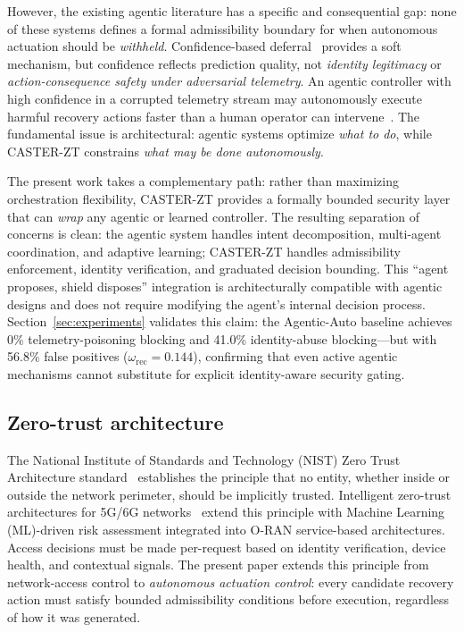 \documentclass[10pt,journal,compsoc]{IEEEtran}
\begin{document}
However, the existing agentic literature has a specific and consequential gap: none of these systems defines a formal admissibility boundary for when autonomous actuation should be \emph{withheld}.
Confidence-based deferral~\cite{toward_autonomous_oran_2026} provides a soft mechanism, but confidence reflects prediction quality, not \emph{identity legitimacy} or \emph{action-consequence safety under adversarial telemetry}.
An agentic controller with high confidence in a corrupted telemetry stream may autonomously execute harmful recovery actions faster than a human operator can intervene~\cite{amodei2016concrete}.
The fundamental issue is architectural: agentic systems optimize \emph{what to do}, while CASTER-ZT constrains \emph{what may be done autonomously}.

The present work takes a complementary path: rather than maximizing orchestration flexibility, CASTER-ZT provides a formally bounded security layer that can \emph{wrap} any agentic or learned controller.
The resulting separation of concerns is clean: the agentic system handles intent decomposition, multi-agent coordination, and adaptive learning; CASTER-ZT handles admissibility enforcement, identity verification, and graduated decision bounding.
This ``agent proposes, shield disposes'' integration is architecturally compatible with agentic designs and does not require modifying the agent's internal decision process.
Section~\ref{sec:experiments} validates this claim: the Agentic-Auto baseline achieves 0\% telemetry-poisoning blocking and 41.0\% identity-abuse blocking---but with 56.8\% false positives ($\omega_{\mathrm{rec}} = 0.144$), confirming that even active agentic mechanisms cannot substitute for explicit identity-aware security gating.

\subsection{Zero-trust architecture}
The National Institute of Standards and Technology (NIST) Zero Trust Architecture standard~\cite{rose2020nist} establishes the principle that no entity, whether inside or outside the network perimeter, should be implicitly trusted.
Intelligent zero-trust architectures for 5G/6G networks~\cite{liyanage2022izta} extend this principle with Machine Learning (ML)-driven risk assessment integrated into O-RAN service-based architectures.
Access decisions must be made per-request based on identity verification, device health, and contextual signals.
The present paper extends this principle from network-access control to \emph{autonomous actuation control}: every candidate recovery action must satisfy bounded admissibility conditions before execution, regardless of how it was generated.
\end{document}
